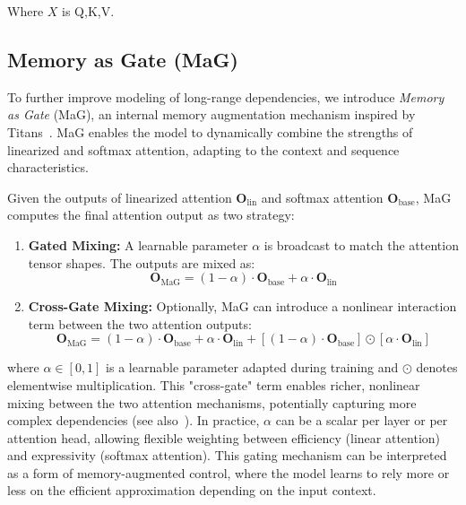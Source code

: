 \documentclass[10pt,a4paper]{article}
\begin{document}
Where $X$ is Q,K,V.



\subsection{Memory as Gate (MaG)}

To further improve modeling of long-range dependencies, we introduce \textit{Memory as Gate} (MaG), an internal memory augmentation mechanism inspired by Titans~\cite{behrouz2024titans}. MaG enables the model to dynamically combine the strengths of linearized and softmax attention, adapting to the context and sequence characteristics.

Given the outputs of linearized attention $\mathbf{O}_{\text{lin}}$ and softmax attention $\mathbf{O}_{\text{base}}$, MaG computes the final attention output as two strategy:
\begin{enumerate}
    \item \textbf{Gated Mixing:} A learnable parameter $\alpha$ is broadcast to match the attention tensor shapes. The outputs are mixed as:
    \begin{equation}
        \mathbf{O}_{\text{MaG}} = (1-\alpha) \cdot \mathbf{O}_{\text{base}} + \alpha \cdot \mathbf{O}_{\text{lin}}
    \end{equation}
    \item \textbf{Cross-Gate Mixing:} Optionally, MaG can introduce a nonlinear interaction term between the two attention outputs:
    \begin{equation}
        \mathbf{O}_{\text{MaG}} = (1-\alpha) \cdot \mathbf{O}_{\text{base}} + \alpha \cdot \mathbf{O}_{\text{lin}} + \left[(1-\alpha) \cdot \mathbf{O}_{\text{base}}\right] \odot \left[\alpha \cdot \mathbf{O}_{\text{lin}}\right]
    \end{equation}
\end{enumerate}

where $\alpha \in [0,1]$ is a learnable parameter adapted during training and $\odot$ denotes elementwise multiplication. This "cross-gate" term enables richer, nonlinear mixing between the two attention mechanisms, potentially capturing more complex dependencies (see also~\cite{munkhdalai2024leave}). In practice, $\alpha$ can be a scalar per layer or per attention head, allowing flexible weighting between efficiency (linear attention) and expressivity (softmax attention). This gating mechanism can be interpreted as a form of memory-augmented control, where the model learns to rely more or less on the efficient approximation depending on the input context.
\end{document}
